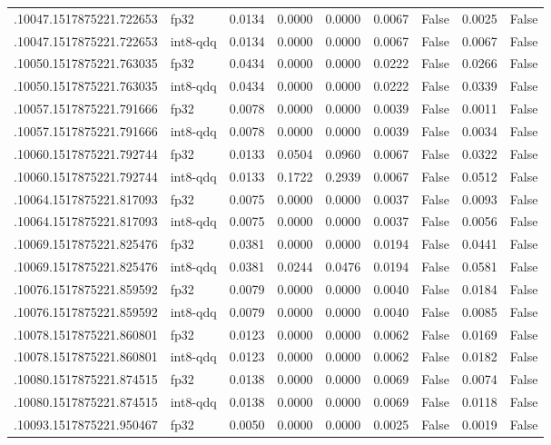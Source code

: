 \begin{tabular}{llrrrrrrr}
.10047.1517875221.722653 & fp32 & 0.0134 & 0.0000 & 0.0000 & 0.0067 & False & 0.0025 & False \\
.10047.1517875221.722653 & int8-qdq & 0.0134 & 0.0000 & 0.0000 & 0.0067 & False & 0.0067 & False \\
.10050.1517875221.763035 & fp32 & 0.0434 & 0.0000 & 0.0000 & 0.0222 & False & 0.0266 & False \\
.10050.1517875221.763035 & int8-qdq & 0.0434 & 0.0000 & 0.0000 & 0.0222 & False & 0.0339 & False \\
.10057.1517875221.791666 & fp32 & 0.0078 & 0.0000 & 0.0000 & 0.0039 & False & 0.0011 & False \\
.10057.1517875221.791666 & int8-qdq & 0.0078 & 0.0000 & 0.0000 & 0.0039 & False & 0.0034 & False \\
.10060.1517875221.792744 & fp32 & 0.0133 & 0.0504 & 0.0960 & 0.0067 & False & 0.0322 & False \\
.10060.1517875221.792744 & int8-qdq & 0.0133 & 0.1722 & 0.2939 & 0.0067 & False & 0.0512 & False \\
.10064.1517875221.817093 & fp32 & 0.0075 & 0.0000 & 0.0000 & 0.0037 & False & 0.0093 & False \\
.10064.1517875221.817093 & int8-qdq & 0.0075 & 0.0000 & 0.0000 & 0.0037 & False & 0.0056 & False \\
.10069.1517875221.825476 & fp32 & 0.0381 & 0.0000 & 0.0000 & 0.0194 & False & 0.0441 & False \\
.10069.1517875221.825476 & int8-qdq & 0.0381 & 0.0244 & 0.0476 & 0.0194 & False & 0.0581 & False \\
.10076.1517875221.859592 & fp32 & 0.0079 & 0.0000 & 0.0000 & 0.0040 & False & 0.0184 & False \\
.10076.1517875221.859592 & int8-qdq & 0.0079 & 0.0000 & 0.0000 & 0.0040 & False & 0.0085 & False \\
.10078.1517875221.860801 & fp32 & 0.0123 & 0.0000 & 0.0000 & 0.0062 & False & 0.0169 & False \\
.10078.1517875221.860801 & int8-qdq & 0.0123 & 0.0000 & 0.0000 & 0.0062 & False & 0.0182 & False \\
.10080.1517875221.874515 & fp32 & 0.0138 & 0.0000 & 0.0000 & 0.0069 & False & 0.0074 & False \\
.10080.1517875221.874515 & int8-qdq & 0.0138 & 0.0000 & 0.0000 & 0.0069 & False & 0.0118 & False \\
.10093.1517875221.950467 & fp32 & 0.0050 & 0.0000 & 0.0000 & 0.0025 & False & 0.0019 & False \\

\end{tabular}
